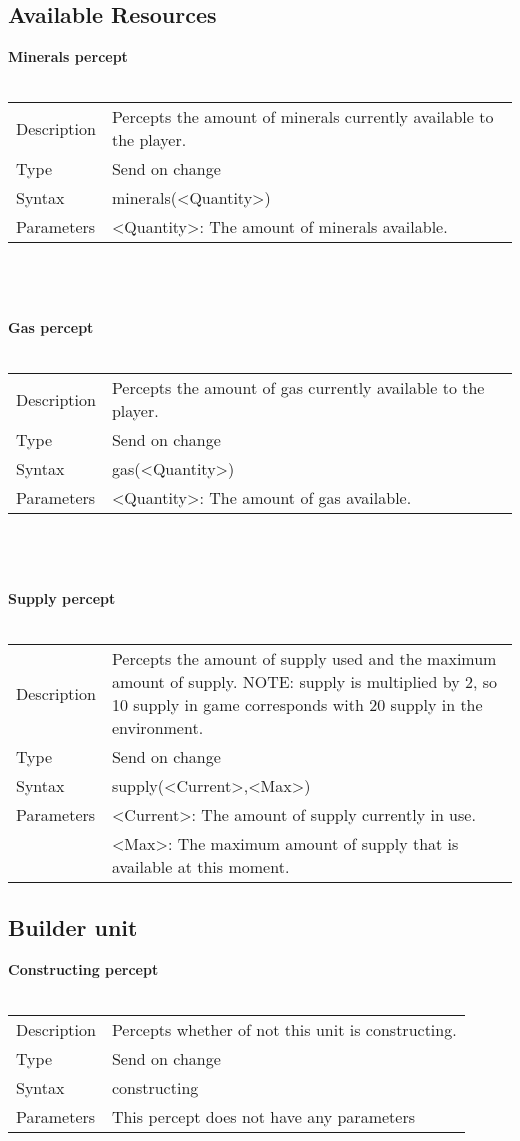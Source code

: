 \documentclass[english,11pt]{report}
\begin{document}
\subsection{Available Resources}
\textbf{Minerals percept}\\
\\
\begin{tabularx}{\textwidth}{lX}
 Description & Percepts the amount of minerals currently available to the player. \\
 Type & Send on change \\
 Syntax & minerals(<Quantity>) \\
 Parameters &   <Quantity>: The amount of minerals available.
\end{tabularx}\\
\\
\\
\textbf{Gas percept}\\
\\
\begin{tabularx}{\textwidth}{lX}
 Description & Percepts the amount of gas currently available to the player. \\
 Type & Send on change \\
 Syntax & gas(<Quantity>) \\
 Parameters &   <Quantity>: The amount of gas available.
\end{tabularx}\\
\\
\\
\textbf{Supply percept}\\
\\
\begin{tabularx}{\textwidth}{lX}
 Description & Percepts the amount of supply used and the maximum amount of supply. NOTE: supply is multiplied by 2, so 10 supply in game corresponds with 20 supply in the environment. \\
 Type & Send on change \\
 Syntax & supply(<Current>,<Max>) \\
 Parameters &   <Current>: The amount of supply currently in use.\\
            &   <Max>: The maximum amount of supply that is available at this moment.
\end{tabularx}

\subsection{Builder unit}
\textbf{Constructing percept}\\
\\
\begin{tabularx}{\textwidth}{lX}
 Description & Percepts whether of not this unit is constructing. \\
 Type & Send on change \\
 Syntax & constructing \\
 Parameters &   This percept does not have any parameters
\end{tabularx}
\end{document}
